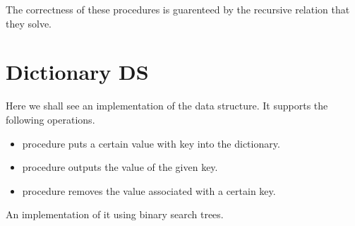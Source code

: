 \documentclass{myclass}
\begin{document}
The correctness of these procedures is guarenteed by the recursive relation that they solve.

\section*{Dictionary DS}

Here we shall see an implementation of the  data structure. It supports the 
following operations.

\begin{itemize}
    \item {} procedure puts a certain value with key into the dictionary.
    \item {} procedure outputs the value of the given key.
    \item {} procedure removes the value associated with a certain key.
\end{itemize}

An implementation of it using binary search trees.
\end{document}
